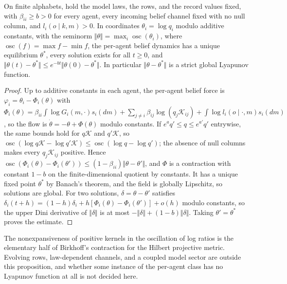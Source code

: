 On finite alphabets, hold the model laws, the rows, and the record values fixed, with $\beta_{ii}\geq b>0$ for every agent, every incoming belief channel fixed with no null column, and $l_i(o\mid k,m)>0$. In coordinates $\theta_i=\log q_i$ modulo additive constants, with the seminorm $\Vert\theta\Vert=\max_i\operatorname{osc}(\theta_i)$, where $\operatorname{osc}(f)=\max f-\min f$, the per-agent belief dynamics has a unique equilibrium $\theta^*$, every solution exists for all $t\geq0$, and $\Vert\theta(t)-\theta^*\Vert\leq e^{-bt}\Vert\theta(0)-\theta^*\Vert$. In particular $\Vert\theta-\theta^*\Vert$ is a strict global Lyapunov function.
\begin{proof}
Up to additive constants in each agent, the per-agent belief force is $\varphi_i=\theta_i-\Phi_i(\theta)$ with $\Phi_i(\theta)=\beta_{ii}\int\log G_i(m,\cdot)s_i(dm)+\sum_{j\neq i}\beta_{ij}\log(q_j\mathcal K_{ij})+\int\log l_i(o\mid\cdot,m)s_i(dm)$, so the flow is $\dot\theta=-\theta+\Phi(\theta)$ modulo constants. If $e^aq'\leq q\leq e^{a'}q'$ entrywise, the same bounds hold for $q\mathcal K$ and $q'\mathcal K$, so $\operatorname{osc}(\log q\mathcal K-\log q'\mathcal K)\leq\operatorname{osc}(\log q-\log q')$; the absence of null columns makes every $q_j\mathcal K_{ij}$ positive. Hence $\operatorname{osc}(\Phi_i(\theta)-\Phi_i(\theta'))\leq(1-\beta_{ii})\Vert\theta-\theta'\Vert$, and $\Phi$ is a contraction with constant $1-b$ on the finite-dimensional quotient by constants. It has a unique fixed point $\theta^*$ by Banach's theorem, and the field is globally Lipschitz, so solutions are global. For two solutions, $\delta=\theta-\theta'$ satisfies $\delta_i(t+h)=(1-h)\delta_i+h[\Phi_i(\theta)-\Phi_i(\theta')]+o(h)$ modulo constants, so the upper Dini derivative of $\Vert\delta\Vert$ is at most $-\Vert\delta\Vert+(1-b)\Vert\delta\Vert$. Taking $\theta'=\theta^*$ proves the estimate.
\end{proof}

The nonexpansiveness of positive kernels in the oscillation of log ratios is the elementary half of Birkhoff's contraction for the Hilbert projective metric. Evolving rows, law-dependent channels, and a coupled model sector are outside this proposition, and whether some instance of the per-agent class has no Lyapunov function at all is not decided here.

